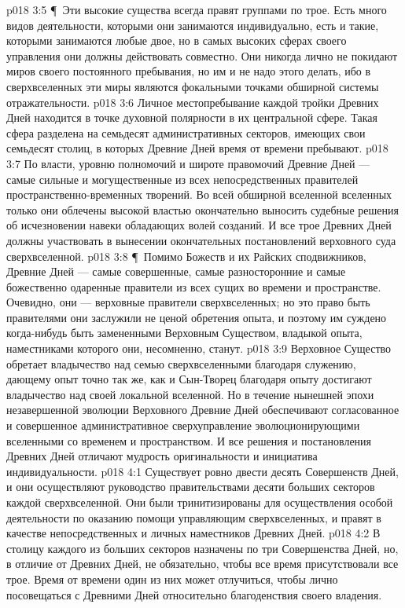 \vs p018 3:5 \P\ Эти высокие существа всегда правят группами по трое. Есть много видов деятельности, которыми они занимаются индивидуально, есть и такие, которыми занимаются любые двое, но в самых высоких сферах своего управления они должны действовать совместно. Они никогда лично не покидают миров своего постоянного пребывания, но им и не надо этого делать, ибо в сверхвселенных эти миры являются фокальными точками обширной системы отражательности.
\vs p018 3:6 Личное местопребывание каждой тройки Древних Дней находится в точке духовной полярности в их центральной сфере. Такая сфера разделена на семьдесят административных секторов, имеющих свои семьдесят столиц, в которых Древние Дней время от времени пребывают.
\vs p018 3:7 По власти, уровню полномочий и широте правомочий Древние Дней --- самые сильные и могущественные из всех непосредственных правителей пространственно\hyp{}временных творений. Во всей обширной вселенной вселенных только они облечены высокой властью окончательно выносить судебные решения об исчезновении навеки обладающих волей созданий. И все трое Древних Дней должны участвовать в вынесении окончательных постановлений верховного суда сверхвселенной.
\vs p018 3:8 \P\ Помимо Божеств и их Райских сподвижников, Древние Дней --- самые совершенные, самые разносторонние и самые божественно одаренные правители из всех сущих во времени и пространстве. Очевидно, они --- верховные правители сверхвселенных; но это право быть правителями они заслужили не ценой обретения опыта, и поэтому им суждено когда\hyp{}нибудь быть замененными Верховным Существом, владыкой опыта, наместниками которого они, несомненно, станут.
\vs p018 3:9 Верховное Существо обретает владычество над семью сверхвселенными благодаря служению, дающему опыт точно так же, как и Сын\hyp{}Творец благодаря опыту достигают владычество над своей локальной вселенной. Но в течение нынешней эпохи незавершенной эволюции Верховного Древние Дней обеспечивают согласованное и совершенное административное сверхуправление эволюционирующими вселенными со временем и пространством. И все решения и постановления Древних Дней отличают мудрость оригинальности и инициатива индивидуальности.
\vs p018 4:1 Существует ровно двести десять Совершенств Дней, и они осуществляют руководство правительствами десяти больших секторов каждой сверхвселенной. Они были тринитизированы для осуществления особой деятельности по оказанию помощи управляющим сверхвселенных, и правят в качестве непосредственных и личных наместников Древних Дней.
\vs p018 4:2 В столицу каждого из больших секторов назначены по три Совершенства Дней, но, в отличие от Древних Дней, не обязательно, чтобы все время присутствовали все трое. Время от времени один из них может отлучиться, чтобы лично посовещаться с Древними Дней относительно благоденствия своего владения.
